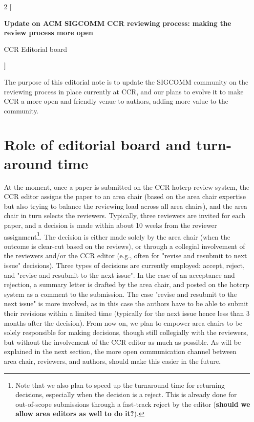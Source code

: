 \documentclass[letterpaper]{article}
\newcommand{\review}{Update on ACM SIGCOMM CCR reviewing process: making the review process more open}
\newcommand{\authors}{CCR Editorial board}
\begin{document}
\begin{multicols}{2}
[
\begin{center}{ \normalfont\sffamily\LARGE\bfseries{\review}}\end{center}
\begin{center}{\normalfont\sffamily\large {\authors}}\end{center}
]
\renewcommand{\sfdefault}{ptm}


The purpose of this editorial note is to update the SIGCOMM community on the reviewing process in place currently at CCR, and our plans to evolve it to make CCR a more open and friendly venue to authors, adding more value to the community.


\section{Role of editorial board and turn-around time}

At the moment, once a paper is submitted on the CCR hotcrp review system, the CCR editor assigns the paper to an area chair (based on the area chair expertise but also trying to balance the reviewing load across all area chairs), and the area chair in turn selects the reviewers. Typically, three reviewers are invited for each paper, and a decision is made within about 10 weeks from the reviewer assignment\footnote{Note that we also plan to speed up the turnaround time for returning decisions, especially when the decision is a reject. This is already done for out-of-scope submissions through a fast-track reject by the editor (\textbf{should we allow area editors as well to do it?}).}. The decision is either made solely by the area chair (when the outcome is clear-cut based on the reviews), or through a collegial involvement of the reviewers and/or the CCR editor (e.g., often for "revise and resubmit to next issue" decisions). Three types of decisions are currently employed: accept, reject, and "revise and resubmit to the next issue". In the case of an acceptance and rejection, a summary letter is drafted by the area chair, and posted on the hotcrp system as a comment to the submission. The case "revise and resubmit to the next issue" is more involved, as in this case the authors have to be able to submit their revisions within a limited time (typically for the next issue hence less than 3 months after the decision). From now on, we plan to empower area chairs to be solely responsible for making decisions, though still collegially with the reviewers, but without the involvement of the CCR editor as much as possible. As will be explained in the next section, the more open communication channel between area chair, reviewers, and authors, should make this easier in the future.


\end{multicols}
\end{document}

